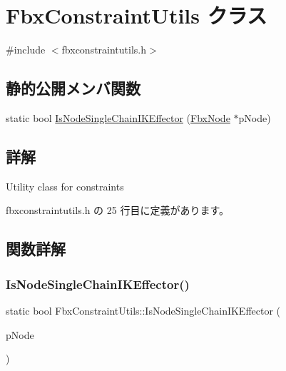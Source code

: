 \hypertarget{class_fbx_constraint_utils}{}\section{Fbx\+Constraint\+Utils クラス}
\label{class_fbx_constraint_utils}


{\ttfamily \#include $<$fbxconstraintutils.\+h$>$}

\subsection*{静的公開メンバ関数}
\begin{DoxyCompactItemize}
\item 
static bool \hyperlink{class_fbx_constraint_utils_a8dd6ec50d31660b74f0195d729714eb7}{Is\+Node\+Single\+Chain\+I\+K\+Effector} (\hyperlink{class_fbx_node}{Fbx\+Node} $\ast$p\+Node)
\end{DoxyCompactItemize}


\subsection{詳解}
Utility class for constraints 

 fbxconstraintutils.\+h の 25 行目に定義があります。



\subsection{関数詳解}
\mbox{\label{class_fbx_constraint_utils_a8dd6ec50d31660b74f0195d729714eb7}} 
\subsubsection{\texorpdfstring{Is\+Node\+Single\+Chain\+I\+K\+Effector()}{IsNodeSingleChainIKEffector()}}
{\footnotesize\ttfamily static bool Fbx\+Constraint\+Utils\+::\+Is\+Node\+Single\+Chain\+I\+K\+Effector (\begin{DoxyParamCaption}\item[{\hyperlink{class_fbx_node}{Fbx\+Node} $\ast$}]{p\+Node }\end{DoxyParamCaption})\hspace{0.3cm}{\ttfamily [static]}}


